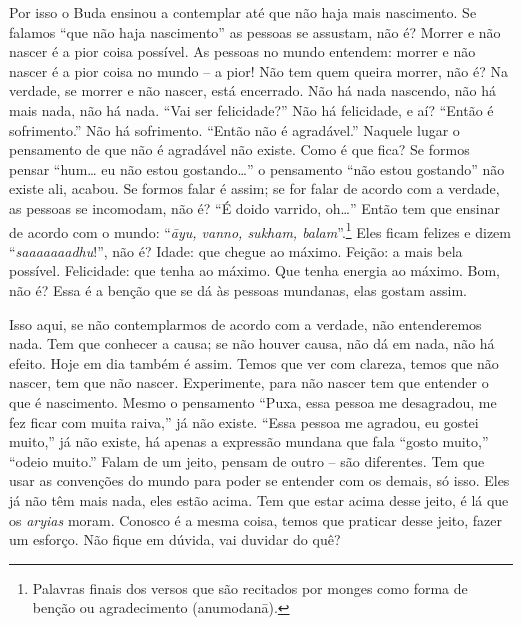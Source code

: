 Por isso o Buda ensinou a contemplar até que não haja mais
nascimento. Se falamos “que não haja nascimento” as pessoas se
assustam, não é? Morrer e não nascer é a pior coisa possível. As
pessoas no mundo entendem: morrer e não nascer é a pior coisa no mundo
– a pior! Não tem quem queira morrer, não é? Na verdade, se morrer e
não nascer, está encerrado. Não há nada nascendo, não há mais nada, não
há nada. “Vai ser felicidade?” Não há felicidade, e aí? “Então é
sofrimento.” Não há sofrimento. “Então não é agradável.” Naquele lugar
o pensamento de que não é agradável não existe. Como é que fica? Se
formos pensar “hum… eu não estou gostando…” o pensamento “não estou
gostando” não existe ali, acabou. Se formos falar é assim; se for falar
de acordo com a verdade, as pessoas se incomodam, não é? “É doido
varrido, oh…” Então tem que ensinar de acordo com o mundo:
“\textit{āyu, vanno, sukham, balam}”.\footnote{Palavras finais dos
versos que são recitados por monges como forma de benção ou
agradecimento (anumodanā).} Eles ficam felizes e dizem
“\textit{saaaaaaadhu}!”, não é? Idade: que chegue ao máximo. Feição: a
mais bela possível. Felicidade: que tenha ao máximo. Que tenha energia
ao máximo. Bom, não é? Essa é a benção que se dá às pessoas mundanas,
elas gostam assim. 

Isso aqui, se não contemplarmos de acordo com a verdade, não
entenderemos nada. Tem que conhecer a causa; se não houver causa, não
dá em nada, não há efeito. Hoje em dia também é assim. Temos que ver
com clareza, temos que não nascer, tem que não nascer. Experimente,
para não nascer tem que entender o que é nascimento. Mesmo o pensamento
“Puxa, essa pessoa me desagradou, me fez ficar com muita raiva,” já não
existe. “Essa pessoa me agradou, eu gostei muito,” já não existe, há
apenas a expressão mundana que fala “gosto muito,” “odeio muito.” Falam
de um jeito, pensam de outro – são diferentes. Tem que usar as
convenções do mundo para poder se entender com os demais, só isso. Eles
já não têm mais nada, eles estão acima. Tem que estar acima desse
jeito, é lá que os \textit{aryias} moram. Conosco é a mesma coisa,
temos que praticar desse jeito, fazer um esforço. Não fique em dúvida,
vai duvidar do quê? 

